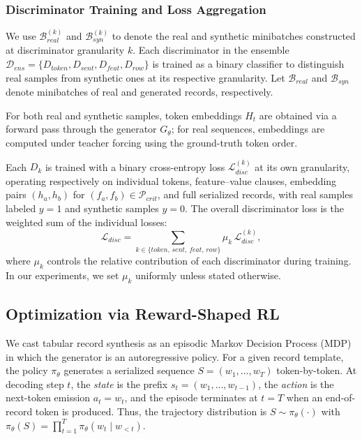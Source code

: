 \subsubsection{Discriminator Training and Loss Aggregation}

We use $\mathcal{B}_{real}^{(k)}$ and $\mathcal{B}_{syn}^{(k)}$ to denote the real and synthetic minibatches constructed at discriminator granularity $k$.
Each discriminator in the ensemble $\mathcal{D}_{ens} = \{D_{token}, D_{sent}, D_{feat}, D_{row}\}$ is trained as a binary classifier to distinguish real samples from synthetic ones at its respective granularity. Let $\mathcal{B}_{real}$ and $\mathcal{B}_{syn}$ denote minibatches of real and generated records, respectively.

For both real and synthetic samples, token embeddings $H_t$ are obtained via a forward pass through the generator $G_\theta$; for real sequences, embeddings are computed under teacher forcing using the ground-truth token order.


Each $D_k$ is trained with a binary cross-entropy loss $\mathcal{L}_{disc}^{(k)}$ at its own granularity, operating respectively on individual tokens, feature--value clauses, embedding pairs $(h_a,h_b)$ for $(f_a,f_b)\in\mathcal{P}_{crit}$, and full serialized records, with real samples labeled $y=1$ and synthetic samples $y=0$. The overall discriminator loss is the weighted sum of the individual losses:
\begin{equation}
\mathcal{L}_{disc} = \sum_{k \in \{token,\,sent,\,feat,\,row\}} \mu_k \, \mathcal{L}_{disc}^{(k)},
\end{equation}
where $\mu_k$ controls the relative contribution of each discriminator during training. In our experiments, we set $\mu_k$ uniformly unless stated otherwise.



\subsection{Optimization via Reward-Shaped RL}
\label{sec:rl_opt}

We cast tabular record synthesis as an episodic Markov Decision Process (MDP) in which the generator is an autoregressive policy. For a given record template, the policy $\pi_\theta$ generates a serialized sequence $S = (w_1,\dots,w_T)$ token-by-token.
At decoding step $t$, the \emph{state} is the prefix $s_t = (w_1,\dots,w_{t-1})$, the \emph{action} is the next-token emission $a_t = w_t$, and the episode terminates at $t=T$ when an end-of-record token is produced. Thus, the trajectory distribution is $S \sim \pi_\theta(\cdot)$ with $\pi_\theta(S)=\prod_{t=1}^{T}\pi_\theta(w_t \mid w_{<t})$.

